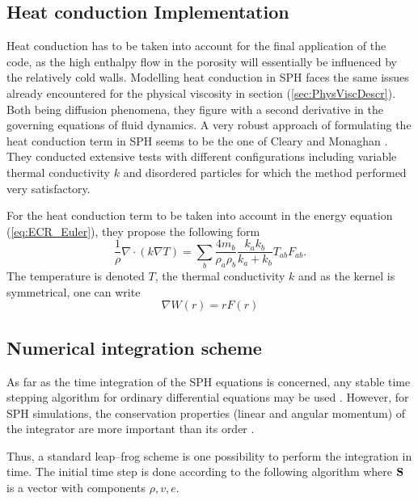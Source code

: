 \documentclass{report}
\begin{document}
\subsection{Heat conduction Implementation}
\label{sec:HeatCondImplementation}
Heat conduction has to be taken into account for the final application of the code, as the high enthalpy flow in the porosity will essentially be influenced by the relatively cold walls. 
Modelling heat conduction in SPH faces the same issues already encountered for the physical viscosity  in section (\ref{sec:PhysViscDescr}). Both being diffusion phenomena, they figure with a second derivative in the governing equations of fluid dynamics. 
A very robust approach of formulating the heat conduction term in SPH seems to be the one of Cleary and Monaghan \cite{Cleary1999}. They conducted extensive tests with different configurations including variable thermal conductivity $k$ and disordered particles for which the method performed very satisfactory.

For the heat conduction term to be taken into account in the energy equation (\ref{eq:ECR_Euler}), they propose the following form
\begin{equation}
 \label{eq:heatConductionTerm}
\frac{1}{\rho}\nabla \cdot (k \nabla T)=\sum_b\frac{4 m_b}{\rho_a \rho_b} \frac{k_a k_b}{k_a + k_b} T_{ab} F_{ab}.
\end{equation}
The temperature is denoted $T$, the thermal conductivity $k$ and as the kernel is symmetrical, one can write 
\begin{equation}
 \label{eq:gradWexpressedAsF}
\nabla W(r)=r F(r)
\end{equation}

\subsection{Numerical integration scheme}
\label{sec:numIntegr}

As far as the time integration of the SPH equations is concerned, any stable
time stepping algorithm for ordinary differential equations may be
used \cite{Monaghan2005}. However, for SPH simulations, the conservation properties
(linear and angular momentum) of the integrator are more important than its
order \cite{Monaghan2005}.

Thus, a standard leap--frog scheme is one possibility to perform the integration in
time. The initial time step is done according to the following algorithm where
${\bf S}$ is a vector with components  $\rho,v,e$.
\end{document}
